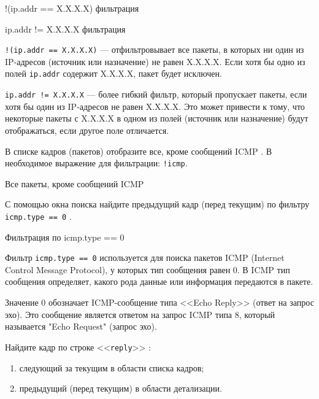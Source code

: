 \begin{image}
	\caption{!(ip.addr == X.X.X.X) фильтрация}
	\label{fig:wrsh:filter:!ip}
\end{image}

\begin{image}
	\caption{ip.addr != X.X.X.X фильтрация}
	\label{fig:wrsh:filter:ip!}
\end{image}

\texttt{!(ip.addr == X.X.X.X)} --- отфильтровывает все пакеты,
в которых ни один из IP-адресов (источник или назначение) не равен X.X.X.X.
Если хотя бы одно из полей \texttt{ip.addr} содержит X.X.X.X,
пакет будет исключен.

\texttt{ip.addr != X.X.X.X} --- более гибкий фильтр,
который пропускает пакеты, если хотя бы один из IP-адресов не равен X.X.X.X.
Это может привести к тому,
что некоторые пакеты с X.X.X.X в одном из полей
(источник или назначение) будут отображаться, если другое поле отличается.

В списке кадров (пакетов) отобразите все,
кроме сообщений ICMP .
В необходимое выражение для фильтрации: \texttt{!icmp}.

\begin{image}
	\caption{Все пакеты, кроме сообщений ICMP}
	\label{fig:wrsh:filter:!icmp}
\end{image}

С помощью окна поиска найдите предыдущий кадр (перед текущим) по фильтру
\texttt{icmp.type == 0} .

\begin{image}
	\caption{Фильтрация по icmp.type == 0}
	\label{fig:wrsh:filter:icmp:type:0}
\end{image}

Фильтр \texttt{icmp.type == 0} используется
для поиска пакетов ICMP (Internet Control Message Protocol),
у которых тип сообщения равен 0.
В ICMP тип сообщения определяет, какого рода данные
или информация передаются в пакете.

Значение 0 обозначает ICMP-сообщение типа <<Echo Reply>> (ответ на запрос эхо).
Это сообщение является ответом на запрос ICMP типа 8,
который называется "Echo Request" (запрос эхо).

Найдите кадр по строке <<\texttt{reply}>> :
\begin{enumerate}
	\item следующий за текущим в области списка кадров;
	\item предыдущий (перед текущим) в области детализации.
\end{enumerate}

